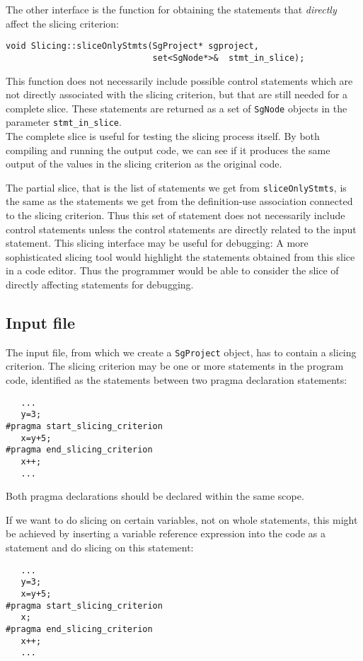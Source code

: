 \documentclass[11pt,a4paper,twoside]{article}
\begin{document}
The other interface is the function for obtaining the statements that \textit{directly} affect the slicing criterion:
\begin{verbatim}
void Slicing::sliceOnlyStmts(SgProject* sgproject,
                             set<SgNode*>&  stmt_in_slice);
\end{verbatim}
This function does not necessarily include possible control statements which are not directly associated with the slicing criterion, but that are still needed for a complete slice. These statements are returned as a set of \texttt{SgNode} objects in the parameter \texttt{stmt\_\-in\_\-slice}.\\

\noindent
The complete slice is useful for testing the slicing process itself. By both compiling and running the output code, we can see if it produces the same output of the values in the slicing criterion as the original code.

The partial slice, that is the list of statements we get from \texttt{slice\-Only\-Stmts}, is the same as the statements we get from the definition-use association connected to the slicing criterion. Thus this set of statement does not necessarily include control statements unless the control statements are directly related to the input statement. This slicing interface may be useful for debugging: A more sophisticated slicing tool would highlight the statements obtained from this slice in a code editor. Thus the programmer would be able to consider the slice of directly affecting statements for debugging.
 
\subsection{Input file}
The input file, from which we create a \texttt{SgProject} object, has to contain a slicing criterion. The slicing criterion may be one or more statements in the program code, identified as the statements between two pragma declaration statements:
\scriptsize
\begin{verbatim}
   ... 
   y=3;
#pragma start_slicing_criterion
   x=y+5;
#pragma end_slicing_criterion
   x++;
   ...
\end{verbatim}
\normalsize
Both pragma declarations should be declared within the same scope.

If we want to do slicing on certain variables, not on whole statements, this might be achieved by inserting a variable reference expression into the code as a statement and do slicing on this statement:
\scriptsize
\begin{verbatim}
   ...
   y=3;
   x=y+5;
#pragma start_slicing_criterion
   x;
#pragma end_slicing_criterion
   x++;
   ...
\end{verbatim}
\normalsize
\end{document}
